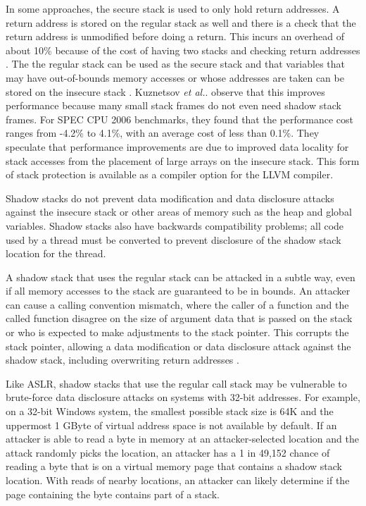 In some approaches, the secure stack is used to only hold return addresses.
A return address is stored on the regular stack as well and there is a
check that the return address is unmodified before doing a return.
This incurs an overhead of about 10\% because of the cost of having two
stacks and checking return addresses \cite{Dang2015}.   The
the regular stack can be used as the secure stack and that variables
that may have out-of-bounds memory accesses or whose addresses are taken
can be stored on the insecure stack \cite{Bhatkar2005, Kuznetsov2014}.  
Kuznetsov {\it et al.}.   
\cite{Kuznetsov2014} observe that this improves performance because
many small stack frames do not even need shadow stack frames.  For
SPEC CPU 2006 benchmarks, they found that the performance cost 
ranges from -4.2\% to 4.1\%,
with an average cost of less than 0.1\%.  They speculate
that performance improvements are due to improved data locality for
stack accesses from the placement of large arrays on the insecure stack.
This form of stack protection is available as a compiler option 
for the LLVM compiler.

Shadow stacks do not prevent data modification and data disclosure attacks
against the insecure stack or other areas of memory such as the heap 
and global variables.  Shadow stacks also have backwards compatibility
problems; all code used by a thread must be converted to prevent disclosure
of the shadow stack location for the thread.  

A shadow stack that uses the regular stack can be attacked in
a subtle way, even if all memory accesses to the stack
are guaranteed to be in bounds.  An attacker can cause a calling convention
mismatch, where the caller of a function and the called function disagree on
the size of argument data that is passed on the stack or who is expected to
make adjustments to the stack pointer.  This corrupts the stack pointer, 
allowing a data modification or data disclosure attack against the shadow stack, including overwriting return addresses \cite{Goktas2014}.

Like ASLR, shadow stacks that use the regular call stack may be vulnerable to 
brute-force data disclosure attacks on systems with 32-bit addresses.
For example, on a 32-bit Windows system, the smallest possible
stack size is 64K and the uppermost 1 GByte of virtual address space
is not available by default.  If an attacker is able to read a byte 
in memory at an attacker-selected location and the attack randomly picks
the location,  an attacker has a 1 in 49,152 
chance of reading a byte that is on a virtual memory page that contains a 
shadow stack location.  With reads of nearby locations, an attacker can likely 
determine if the page containing the byte contains part of a stack.

